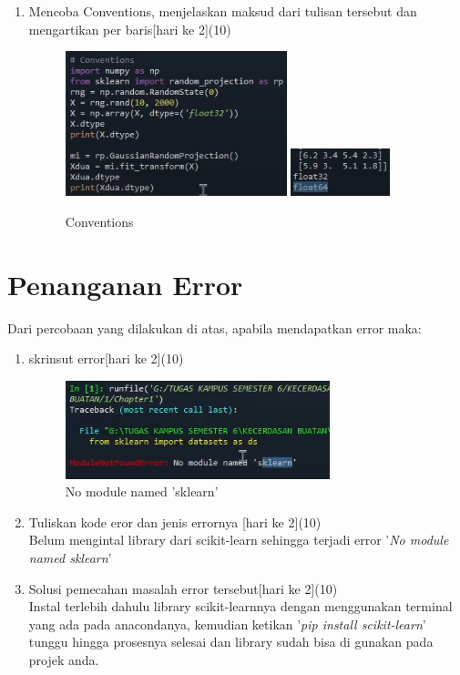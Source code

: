 \begin{enumerate}
\item 
Mencoba Conventions, menjelaskan maksud dari tulisan tersebut dan mengartikan per baris[hari ke 2](10)

\begin{figure}[ht]
    \centerline{\includegraphics[scale=0.8]{images/Chapter1/Chapter1f.png}
    \includegraphics[scale=0.8]{images/Chapter1/Chapter1fa.png}}
    \caption{Conventions}
    \label{Conventions}
    \end{figure}
    
\end{enumerate}

\section{Penanganan Error}
Dari percobaan yang dilakukan di atas, apabila mendapatkan error maka:

\begin{enumerate}
	\item
	skrinsut error[hari ke 2](10)
	
\begin{figure}[ht]
    \centerline{\includegraphics[scale=1]{images/Chapter1/Chapter1error.png}}
    \caption{No module named 'sklearn'}
    \label{ChapterError}
\end{figure}
    
    \newpage
	\item
    Tuliskan kode eror dan jenis errornya [hari ke 2](10)
    \\ Belum mengintal library dari scikit-learn sehingga terjadi error '\textit{No module named sklearn}'
	\item
    Solusi pemecahan masalah error tersebut[hari ke 2](10)
    \\ Instal terlebih dahulu library scikit-learnnya dengan menggunakan terminal yang ada pada anacondanya, kemudian ketikan '\textit{pip install scikit-learn}' tunggu hingga prosesnya selesai dan library sudah bisa di gunakan pada projek anda.
    

\end{enumerate}

